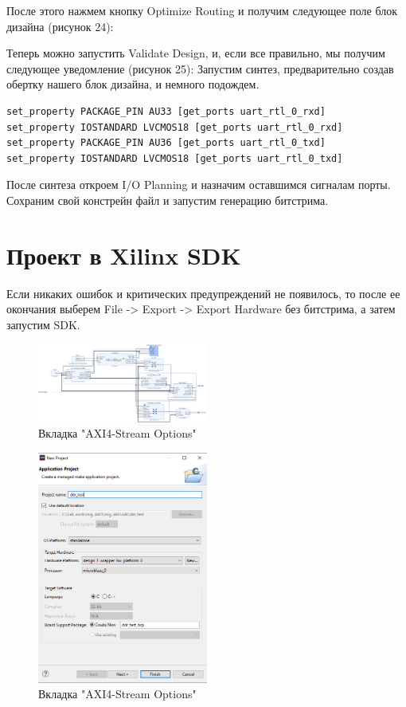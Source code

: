 \documentclass[a4paper,oneside ,10pt]{extreport}
\begin{document}
    После этого нажмем кнопку Optimize Routing и получим следующее поле блок дизайна (рисунок 24):

    Теперь можно запустить Validate Design, и, если все правильно, мы получим следующее уведомление (рисунок 25):
    Запустим синтез, предварительно создав обертку нашего блок дизайна, и немного подождем.

\begin{Verbatim}[tabsize=4]
set_property PACKAGE_PIN AU33 [get_ports uart_rtl_0_rxd]
set_property IOSTANDARD LVCMOS18 [get_ports uart_rtl_0_rxd]
set_property PACKAGE_PIN AU36 [get_ports uart_rtl_0_txd]
set_property IOSTANDARD LVCMOS18 [get_ports uart_rtl_0_txd]
\end{Verbatim}

    После синтеза откроем I/O Planning и назначим оставшимся сигналам порты. Сохраним свой констрейн файл и запустим генерацию битстрима. 

\section{Проект в Xilinx SDK}
    Если никаких ошибок и критических предупреждений не появилось, то после ее окончания выберем File -> Export -> Export Hardware без битстрима, а затем запустим SDK.
\begin{figure}[h]
	\centering
	\includegraphics[width=0.5\textwidth]{image/mig_m_4.png}
	\caption{Вкладка "AXI4-Stream Options"}
	\label{mig_m_4}
\end{figure}

\begin{figure}[h]
	\centering
	\includegraphics[width=0.5\textwidth]{image/mig_m_sdk_0.png}
	\caption{Вкладка "AXI4-Stream Options"}
	\label{mig_m_sdk_0}
\end{figure}
\end{document}
